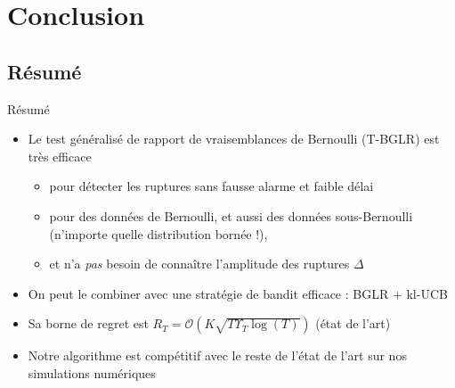 \documentclass[11pt,french,ignorenonframetext,]{beamer}
\providecommand{\tightlist}{%
  \setlength{\itemsep}{0pt}\setlength{\parskip}{0pt}}
\begin{document}







\section{\hfill{}Conclusion\hfill{}}
\subsection{Résumé}

\begin{frame}{Résumé}

  \begin{itemize}
    \item
    Le test généralisé de rapport de vraisemblances de Bernoulli (T-BGLR) est très efficace \dCooley{}
    \begin{itemize}\tightlist
      \item
      pour détecter les ruptures \alert{sans fausse alarme} et \alert{faible délai}
      \item
      pour des données de Bernoulli, et aussi des données sous-Bernoulli (n'importe quelle distribution bornée !),
      \item
      et n'a \emph{pas} besoin de connaître l'amplitude des ruptures $\Delta$
    \end{itemize}
    \item
    On peut le combiner avec une stratégie de bandit efficace :
    \alert{BGLR + kl-UCB}  \dCooley{}
    \item
    Sa borne de regret est $R_T = \mathcal{O}(K \sqrt{T \Upsilon_T \log(T)})$  \dCooley{} (état de l'art)
    \item
    Notre algorithme est compétitif avec le reste de l'état de l'art sur nos simulations numériques \dCooley{}
  \end{itemize}

\end{frame}
\end{document}
